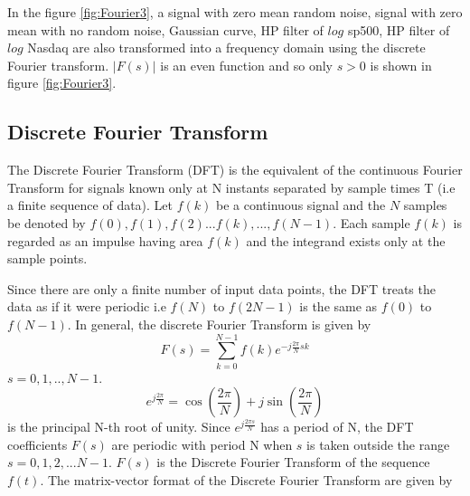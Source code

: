 In the figure \ref{fig:Fourier3}, a signal with zero mean random noise, signal with zero mean with no random noise, Gaussian curve, HP filter of $log$ sp500, HP filter of $log$ Nasdaq are also transformed into a  frequency domain using the discrete Fourier transform. $|F(s)|$ is an even function and so only $s>0$ is shown in figure \ref{fig:Fourier3}.
\subsection{Discrete Fourier Transform}
The Discrete Fourier Transform (DFT) is the equivalent of the continuous Fourier Transform for signals known only at N instants separated by sample times T (i.e a finite sequence of data). Let $f(k)$ be a continuous signal and the $N$ samples be denoted by $f(0), f(1), f(2)... f(k),...,f(N-1)$. Each sample $f(k)$ is regarded as an impulse having area $f(k)$ and the integrand exists only at the sample points.

Since there are only a finite number of input data points, the DFT treats the data as if it were periodic i.e $f(N)$ to $f(2N-1)$ is the same as $f(0)$ to $f(N-1)$. In general, the discrete Fourier Transform is given by
\begin{equation}
F(s) = \sum_{k=0}^{N-1} f(k) e^{-j\frac{2\pi}{N} sk }
\end{equation}
$s = 0,1,..,N-1$.
\begin{equation}
e^{j\frac{2\pi}{N}} = \cos(\frac{2\pi}{N}) + j \sin(\frac{2\pi}{N})
\end{equation}
is the principal N-th root of unity. Since $ e^{j\frac{2\pi s}{N}}$ has a period of N, the DFT coefficients $F(s)$ are periodic with period N when $s$ is taken outside the range $s = 0,1,2,...N-1$. $F(s)$ is the Discrete Fourier Transform of the sequence $f(t)$. The matrix-vector format of the Discrete Fourier Transform are given by

